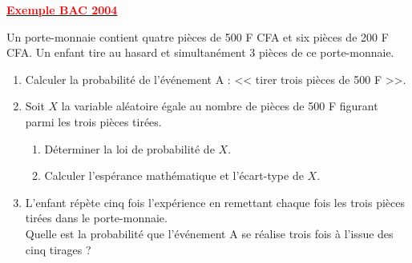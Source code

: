 \documentclass[12pt,a4paper]{article}
\begin{document}
\underline{\textbf{\textcolor{red}{Exemple BAC 2004}}}


Un porte-monnaie contient quatre pièces de 500 F CFA et six pièces de 200 F CFA. Un enfant tire au hasard et simultanément 3 pièces de ce porte-monnaie.

\begin{enumerate}
    \item Calculer la probabilité de l'événement A : << tirer trois pièces de 500 F >>.
    
    \item Soit $X$ la variable aléatoire égale au nombre de pièces de 500 F figurant parmi les trois pièces tirées.
    \begin{enumerate}
        \item Déterminer la loi de probabilité de $X$.
        \item Calculer l'espérance mathématique et l'écart-type de $X$.
    \end{enumerate}
    
    \item L'enfant répète cinq fois l'expérience en remettant chaque fois les trois pièces tirées dans le porte-monnaie. \\
    Quelle est la probabilité que l'événement A se réalise trois fois à l'issue des cinq tirages ?
\end{enumerate}
\end{document}

